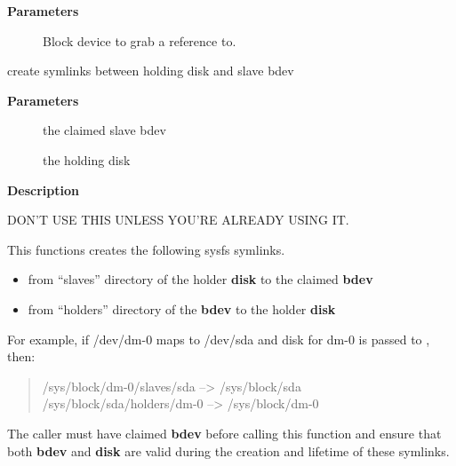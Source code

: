\documentclass[a4paper,8pt,english]{sphinxmanual}
\begin{document}
\textbf{Parameters}
\begin{description}
\item[{}] \leavevmode
Block device to grab a reference to.

\end{description}

\begin{fulllineitems}
\label{filesystems/index:c.bd_link_disk_holder}
create symlinks between holding disk and slave bdev

\end{fulllineitems}


\textbf{Parameters}
\begin{description}
\item[{}] \leavevmode
the claimed slave bdev

\item[{}] \leavevmode
the holding disk

\end{description}

\textbf{Description}

DON'T USE THIS UNLESS YOU'RE ALREADY USING IT.

This functions creates the following sysfs symlinks.
\begin{itemize}
\item {} 
from ``slaves'' directory of the holder \textbf{disk} to the claimed \textbf{bdev}

\item {} 
from ``holders'' directory of the \textbf{bdev} to the holder \textbf{disk}

\end{itemize}

For example, if /dev/dm-0 maps to /dev/sda and disk for dm-0 is
passed to {\hyperref[filesystems/index:c.bd_link_disk_holder]{\emph{}}}, then:
\begin{quote}

/sys/block/dm-0/slaves/sda --\textgreater{} /sys/block/sda
/sys/block/sda/holders/dm-0 --\textgreater{} /sys/block/dm-0
\end{quote}

The caller must have claimed \textbf{bdev} before calling this function and
ensure that both \textbf{bdev} and \textbf{disk} are valid during the creation and
lifetime of these symlinks.
\end{document}
